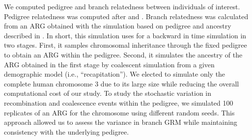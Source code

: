\begin{table}
  \centering
  \caption{Selected regions and parishes from the BALSAC French-Canadian Pedigree}
  \renewcommand{\arraystretch}{1.2}
  \label{tab:parishes}
\end{table}

We computed pedigree and branch relatedness between individuals of interest.
%
Pedigree relatedness was computed after
\citet{lange1992calculation} and \citet{colleau2002indirect}.
%
Branch relatedness was calculated from an ARG
obtained with the simulation based on pedigree and ancestry
described in \citet{andersontrocme2023genes}.
%
In short, this simulation uses \msprime{} \citep{baumdicker2022efficient} 
for a backward in time simulation in two stages.
%
First, it samples chromosomal inheritance through the fixed pedigree
to obtain an ARG within the pedigree.
%
Second, it simulates the ancestry of the ARG obtained in the first stage
by coalescent simulation from a given demographic model
(i.e., ``recapitation'').
%
We elected to simulate only the complete human chromosome 3 due to its large size
while reducing the overall computational cost of our study.
%
To study the stochastic variation in recombination and coalescence events within the pedigree,
we simulated 100 replicates of an ARG for the chromosome using different random seeds.
%
This approach allowed us to assess the variance in branch GRM
while maintaining consistency with the underlying pedigree.

